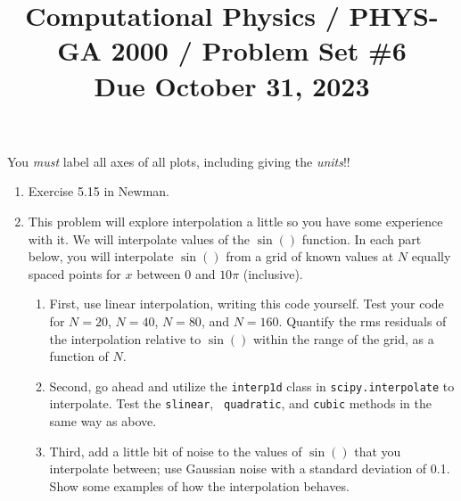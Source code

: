 \documentclass[11pt, preprint]{aastex}
\begin{document}
\title{\bf Computational Physics / PHYS-GA 2000 / Problem Set \#6
\\ Due October 31, 2023 }

You {\it must} label all axes of all plots, including giving the {\it
  units}!!

\begin{enumerate}
\item Exercise 5.15 in Newman.
\item This problem will explore interpolation a little so you have
  some experience with it. We will interpolate values of the $\sin()$
  function. In each part below, you will interpolate $\sin()$ from a
  grid of known values at $N$ equally spaced points for $x$ between
  $0$ and $10\pi$ (inclusive).
\begin{enumerate}
\item First, use linear interpolation, writing this code
  yourself. Test your code for $N=20$, $N=40$, $N=80$, and
  $N=160$. Quantify the rms residuals of the interpolation relative to
  $\sin()$ within the range of the grid, as a function of $N$.
\item Second, go ahead and utilize the {\tt interp1d} class in
  {\tt scipy.interpolate} to interpolate. Test the {\tt slinear}, {\tt
    quadratic}, and {\tt cubic} methods in the same way as above.
\item Third, add a little bit of noise to the values of $\sin()$ that
  you interpolate between; use Gaussian noise with a standard
  deviation of 0.1. Show some examples of how the interpolation
  behaves.
\end{enumerate}
  
\end{enumerate}
\end{document}

